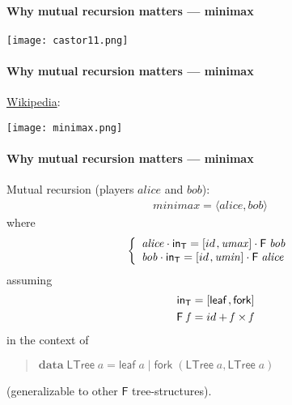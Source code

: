 \documentclass{elsarticle}
\newcommand{\Varid}[1]{\mathit{#1}}
\newenvironment{lcbr}{\left\{\begin{array}{l}}{\end{array}\right.}
\def\alt#1#2{\mathopen{[}#1\hskip 1pt,#2\mathclose{]}}
\def\comp{ \mathbin{\cdot} }
\def\fun#1{\mathsf{#1}}
\def\conj#1#2{\mathopen{\langle} #1, #2 \mathclose{\rangle}}
\def\start{&&}
\def\more{\\&&}
\begin{document}
\paragraph{Why mutual recursion matters --- minimax}
\begin{center}
	\texttt{[image: castor11.png]}
\end{center}
%

\paragraph{Why mutual recursion matters --- minimax}
\href{https://en.wikipedia.org/wiki/Minimax}{Wikipedia}:
\begin{center}
	\texttt{[image: minimax.png]}
\end{center}
%

\paragraph{Why mutual recursion matters --- minimax}
\small
Mutual recursion (players \ensuremath{\Varid{alice}} and \ensuremath{\Varid{bob}}):
\begin{eqnarray*}
	\ensuremath{\Varid{minimax}\mathrel{=}\conj{\Varid{alice}}{\Varid{bob}}}
\end{eqnarray*}
where
\begin{eqnarray*}
\ensuremath{\begin{lcbr}\Varid{alice} \comp \mathsf{in}_{\fun T}\mathrel{=}\alt{{id}}{\Varid{umax}} \comp \fun F \;\Varid{bob}\\\Varid{bob} \comp \mathsf{in}_{\fun T}\mathrel{=}\alt{{id}}{\Varid{umin}} \comp \fun F \;\Varid{alice}\end{lcbr}}
\end{eqnarray*}
\vfill
assuming
\begin{eqnarray*}
\start	\ensuremath{\mathsf{in}_{\fun T}\mathrel{=}\alt{\mathsf{leaf}}{\mathsf{fork}}}
\more	\ensuremath{\fun F \;\Varid{f}\mathrel{=}{id}\mathbin{+}\Varid{f} \times \Varid{f}}
\end{eqnarray*}
in the context of
\begin{quote}
\ensuremath{\mathbf{data}\;\mathsf{LTree}\;\Varid{a}\mathrel{=}\mathsf{leaf}\;\Varid{a}\mid \mathsf{fork}\;(\mathsf{LTree}\;\Varid{a},\mathsf{LTree}\;\Varid{a})}
\end{quote}
(generalizable to other \ensuremath{\fun F } tree-structures).
%
\end{document}
